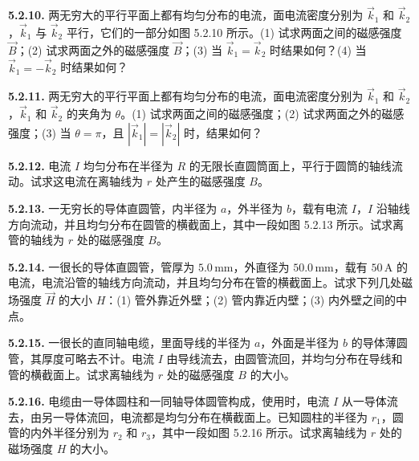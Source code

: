 \vfill
\newpage

\textbf{5.2.10.} 两无穷大的平行平面上都有均匀分布的电流，面电流密度分别为 $\vec{k}_{1}$ 和 $\vec{k}_{2}$，$\vec{k}_{1}$ 与 $\vec{k}_{2}$ 平行，它们的一部分如图 5.2.10 所示。(1) 试求两面之间的磁感强度 $\vec{B}$；(2) 试求两面之外的磁感强度 $\vec{B}$；(3) 当 $\vec{k}_{1} = \vec{k}_{2}$ 时结果如何？(4) 当 $\vec{k}_{1} = -\vec{k}_{2}$ 时结果如何？

\begin{center}
\end{center}

\vfill
\newpage

\textbf{5.2.11.} 两无穷大的平行平面上都有均匀分布的电流，面电流密度分别为 $\vec{k}_{1}$ 和 $\vec{k}_{2}$，$\vec{k}_{1}$ 和 $\vec{k}_{2}$ 的夹角为 $\theta$。(1) 试求两面之间的磁感强度；(2) 试求两面之外的磁感强度；(3) 当 $\theta = \pi$，且 $|\vec{k}_{1}| = |\vec{k}_{2}|$ 时，结果如何？

\vfill
\newpage

\textbf{5.2.12.} 电流 $I$ 均匀分布在半径为 $R$ 的无限长直圆筒面上，平行于圆筒的轴线流动。试求这电流在离轴线为 $r$ 处产生的磁感强度 $B$。

\vfill
\newpage

\textbf{5.2.13.} 一无穷长的导体直圆管，内半径为 $a$，外半径为 $b$，载有电流 $I$，$I$ 沿轴线方向流动，并且均匀分布在圆管的横截面上，其中一段如图 5.2.13 所示。试求离管的轴线为 $r$ 处的磁感强度 $B$。

\begin{center}
\end{center}

\vfill
\newpage

\textbf{5.2.14.} 一很长的导体直圆管，管厚为 $5.0\,\mathrm{mm}$，外直径为 $50.0\,\mathrm{mm}$，载有 $50\,\mathrm{A}$ 的电流，电流沿管的轴线方向流动，并且均匀分布在管的横截面上。试求下列几处磁场强度 $\vec{H}$ 的大小 $H$：(1) 管外靠近外壁；(2) 管内靠近内壁；(3) 内外壁之间的中点。

\vfill
\newpage

\textbf{5.2.15.} 一很长的直同轴电缆，里面导线的半径为 $a$，外面是半径为 $b$ 的导体薄圆管，其厚度可略去不计。电流 $I$ 由导线流去，由圆管流回，并均匀分布在导线和管的横截面上。试求离轴线为 $r$ 处的磁感强度 $B$ 的大小。

\vfill
\newpage

\textbf{5.2.16.} 电缆由一导体圆柱和一同轴导体圆管构成，使用时，电流 $I$ 从一导体流去，由另一导体流回，电流都是均匀分布在横截面上。已知圆柱的半径为 $r_{1}$，圆管的内外半径分别为 $r_{2}$ 和 $r_{3}$，其中一段如图 5.2.16 所示。试求离轴线为 $r$ 处的磁场强度 $H$ 的大小。

